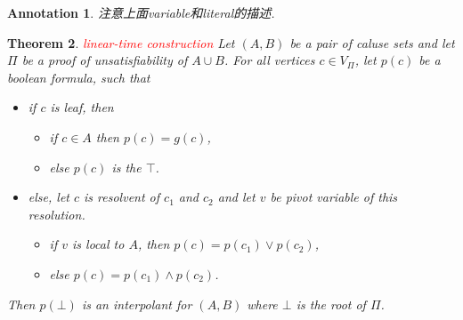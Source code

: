 \documentclass{article}
\newtheorem{theorem}{Theorem}[section]
\newtheorem{annotation}[theorem]{Annotation}
\newcommand{\redt}[1]{\textcolor{red}{#1}}
\begin{document}
\begin{annotation}
\rm 注意上面variable和literal的描述. 
\end{annotation}

\begin{theorem}
\rm \redt{linear-time construction} Let $(A,B)$ be a pair of caluse sets and let $\varPi$ be a proof of unsatisfiability of $A \cup B$. For all vertices $c \in V_{\varPi}$, let $p(c)$ be a boolean formula, such that 
\begin{itemize}
	\item if $c$ is leaf, then
	\begin{itemize}
		\item if $c \in A$ then $p(c) = g(c)$,
		\item else $p(c)$ is the $\top$.
	\end{itemize}
	\item else, let $c$ is resolvent of $c_1$ and $c_2$ and let $v$ be pivot variable of this resolution. 
	\begin{itemize}
		\item if $v$ is local to $A$, then $p(c) = p(c_1) \vee p(c_2)$,
		\item else $p(c) = p(c_1) \wedge p(c_2)$.
	\end{itemize}
\end{itemize}
Then $p(\bot)$ is an interpolant for $(A, B)$ where $\bot$ is the root of $\varPi$.
\end{theorem}
\end{document}
